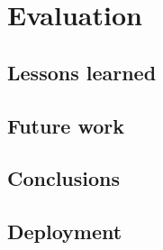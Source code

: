 \chapter{Evaluation}

\section{Lessons learned}

\section{Future work}

\section{Conclusions}

\section{Deployment}
